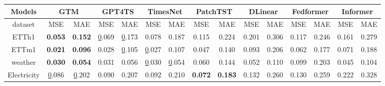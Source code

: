 \begin{table*}[]
\centering
\caption{Average MSE and MAE results of Imputation. Results are averaged over 4 different data missing ratios-$\{12.5\%, 25\%, 37.5\%, 50\%\}$ at the time-point level. \textbf{Bold}: the best performance, {\ul Underline} the second-best performance. Full results and more details are listed in Table\ref{table:full-imputation} in Appendix.}
\label{table:avg. results of Imputation}
\small  %
\setlength{\tabcolsep}{4pt} %
\renewcommand{\arraystretch}{0.8} %
\begin{tabular}{c|cc|cc|cc|cc|cc|cc|cc}
\toprule
Models & \multicolumn{2}{c|}{GTM} & \multicolumn{2}{c|}{GPT4TS} & \multicolumn{2}{c|}{TimesNet} & \multicolumn{2}{c|}{PatchTST} & \multicolumn{2}{c|}{DLinear} & \multicolumn{2}{c|}{Fedformer} & \multicolumn{2}{c}{Informer} \\\midrule
dataset & MSE & MAE & MSE & MAE & MSE & MAE & MSE & MAE & MSE & MAE & MSE & MAE & MSE & MAE \\\midrule
ETTh1 & \textbf{0.053} & \textbf{0.152} & {\color[HTML]{000000} {\ul 0.069}} & {\color[HTML]{000000} {\ul 0.173}} & 0.078 & 0.187 & 0.115 & 0.224 & 0.201 & 0.306 & 0.117 & 0.246 & 0.161 & 0.279 \\
ETTm1 & \textbf{0.021} & \textbf{0.096} & 0.028 & {\color[HTML]{343434} {\ul 0.105}} & {\color[HTML]{343434} {\ul 0.027}} & 0.107 & 0.047 & 0.140 & 0.093 & 0.206 & 0.062 & 0.177 & 0.071 & 0.188 \\
weather & \textbf{0.030} & \textbf{0.054} & 0.031 & 0.056 & {\color[HTML]{000000} {\ul 0.030}} & {\color[HTML]{000000} {\ul 0.054}} & 0.060 & 0.144 & 0.052 & 0.110 & 0.099 & 0.203 & 0.045 & 0.104 \\
Electricity & {\color[HTML]{000000} {\ul 0.086}} & {\color[HTML]{000000} {\ul 0.202}} & 0.090 & 0.207 & 0.092 & 0.210 & \textbf{0.072} & \textbf{0.183} & 0.132 & 0.260 & 0.130 & 0.259 & 0.222 & 0.328
\\
            \bottomrule
\end{tabular}

\end{table*}